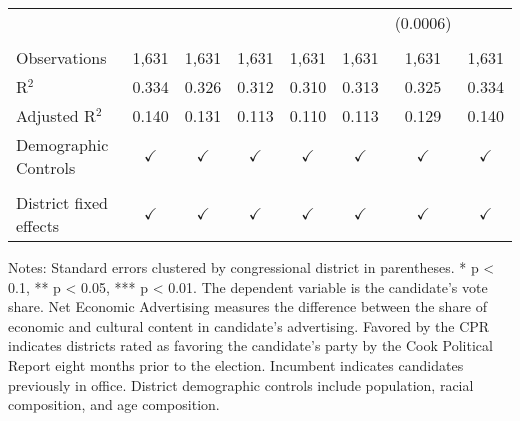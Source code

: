 \begin{table}[htbp]
\begin{tabular}{lccccccc}
                                  &               &               &               &               &                & (0.0006)       &   \\   
       \\
      Observations                & 1,631         & 1,631         & 1,631         & 1,631         & 1,631          & 1,631          & 1,631\\  
      R$^2$                       & 0.334         & 0.326         & 0.312         & 0.310         & 0.313          & 0.325          & 0.334\\  
      Adjusted R$^2$              & 0.140         & 0.131         & 0.113         & 0.110         & 0.113          & 0.129          & 0.140\\  
      Demographic Controls        & $\checkmark$  & $\checkmark$  & $\checkmark$  & $\checkmark$  & $\checkmark$   & $\checkmark$   & $\checkmark$\\   
       \\
      District fixed effects      & $\checkmark$  & $\checkmark$  & $\checkmark$  & $\checkmark$  & $\checkmark$   & $\checkmark$   & $\checkmark$\\   
      \bottomrule
   \end{tabular}
   
   \par \raggedright 
   \footnotesize Notes: Standard errors clustered by congressional district in parentheses. * p < 0.1, ** p < 0.05, *** p < 0.01. The dependent variable is the candidate's vote share. Net Economic Advertising measures the difference between the share of economic and cultural content in candidate's advertising. Favored by the CPR indicates districts rated as favoring the candidate's party by the Cook Political Report eight months prior to the election. Incumbent indicates candidates previously in office. District demographic controls include population, racial composition, and age composition.
\end{table}


